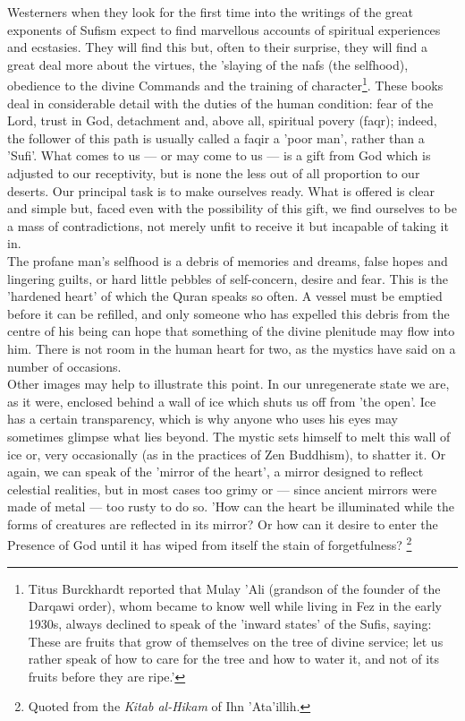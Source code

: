 \documentclass[11pt, b5paper, twoside]{book}
\begin{document}
Westerners when they look for the first time into the writings of the great exponents of Sufism 
expect to find marvellous accounts of spiritual experiences and ecstasies. They will find this but, 
often to their surprise, they will find a great deal more about the virtues, the 'slaying of the nafs 
(the selfhood), obedience to the divine Commands and the training of character\footnote{Titus Burckhardt reported that Mulay 'Ali (grandson of the founder of the Darqawi order), whom 
became to know well while living in Fez in the early 1930s, always declined to speak of the 'inward 
states' of the Sufis, saying: These are fruits that grow of themselves on the tree of divine service; 
let us rather speak of how to care for the tree and how to water it, and not of its fruits before 
they are ripe.' }. These books 
deal in considerable detail with the duties of the human condition: fear of the Lord, trust in God, 
detachment and, above all, spiritual povery (faqr); indeed, the follower of this path is usually 
called a faqir a 'poor man', rather than a 'Sufi'. What comes to us --- or may come to us --- is a gift 
from God which is adjusted to our receptivity, but is none the less out of all proportion to our 
deserts. Our principal task is to make ourselves ready. What is offered is clear and simple but, 
faced even with the possibility of this gift, we find ourselves to be a mass of contradictions, not 
merely unfit to receive it but incapable of taking it in. \\

The profane man's selfhood is a debris of memories and dreams, false hopes and lingering guilts, or 
hard little pebbles of self-concern, desire and fear. This is the 'hardened heart' of which the Quran 
speaks so often. A vessel must be emptied before it can be refilled, and only someone who has 
expelled this debris from the centre of his being can hope that something of the divine plenitude may 
flow into him. There is not room in the human heart for two, as the mystics have said on a number of 
occasions. \\

Other images may help to illustrate this point. In our unregenerate state we are, as it were, 
enclosed behind a wall of ice which shuts us off from 'the open'. Ice has a certain transparency, 
which is why anyone who uses his eyes may sometimes glimpse what lies beyond. The mystic sets himself 
to melt this wall of ice or, very occasionally (as in the practices of Zen Buddhism), to shatter it. 
Or again, we can speak of the 'mirror of the heart', a mirror designed to reflect celestial 
realities, but in most cases too grimy or --- since ancient mirrors were made of metal --- too rusty to 
do so. 'How can the heart be illuminated while the forms of creatures are reflected in its mirror? Or how can it desire to enter the Presence of God until it has wiped from itself the stain of 
forgetfulness? \footnote{Quoted from the \emph{Kitab al-Hikam} of Ihn 'Ata'illih.}\\
\end{document}
